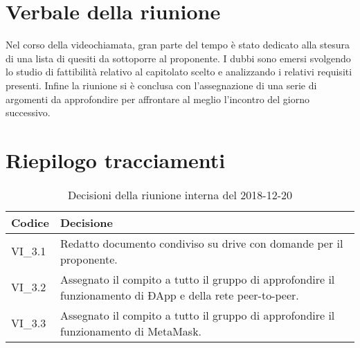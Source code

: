 \section{Verbale della riunione}
Nel corso della videochiamata, gran parte del tempo è stato dedicato alla 
stesura di una lista di quesiti da sottoporre al proponente. I dubbi sono emersi
svolgendo lo studio di fattibilità relativo al capitolato\glo{} scelto e 
analizzando i
relativi requisiti presenti.
Infine la riunione si è conclusa con l'assegnazione di una serie di argomenti 
da approfondire per affrontare al meglio l'incontro del giorno 
successivo.
\pagebreak
\section{Riepilogo tracciamenti}
	\renewcommand{\arraystretch}{1.5}
	\begin{longtable}{ >{\centering}p{} >{}p{}}
		\caption{Decisioni della riunione interna del 2018-12-20}\\	
		\rowcolorhead
		\textbf{\color{white}Codice} 
		& \centering\textbf{\color{white}Decisione} 
		\tabularnewline 
		\endfirsthead
		VI\_3.1 & Redatto documento condiviso su drive con domande per il 
		proponente.
	
		\tabularnewline 
		VI\_3.2 & Assegnato il compito a tutto il gruppo di approfondire il 
		funzionamento
					di ÐApp\glo{} e della rete peer-to-peer\glo{}.
		
		\tabularnewline
		VI\_3.3 & Assegnato il compito a tutto il gruppo di approfondire il 
		funzionamento
					di MetaMask\glo{}.
					
	
	\end{longtable}


